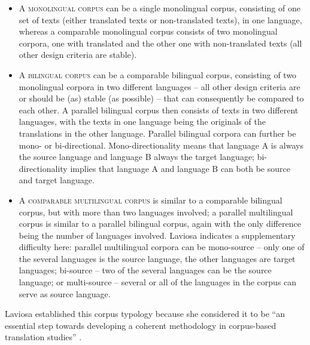 \begin{itemize}
\item 
A \textsc{monolingual corpus} can be a single monolingual corpus, consisting of one set of texts (either translated texts or non-translated texts), in one language, whereas a comparable monolingual corpus consists of two monolingual corpora, one with translated and the other one with non-translated texts (all other design criteria are stable).
\item 
A \textsc{bilingual corpus} can be a comparable bilingual corpus, consisting of two monolingual corpora in two different languages – all other design criteria are or should be (as) stable (as possible) – that can consequently be compared to each other. A parallel bilingual corpus then consists of texts in two different languages, with the texts in one language being the originals of the translations in the other language. Parallel bilingual corpora can further be mono- or bi-directional. Mono-directionality means that language A is always the source language and language B always the target language; bi-directionality implies that language A and language B can both be source and target language.
\item 
A \textsc{comparable multilingual corpus} is similar to a comparable bilingual corpus, but with more than two languages involved; a parallel multilingual corpus is similar to a parallel bilingual corpus, again with the only difference being the number of languages involved. Laviosa indicates a supplementary difficulty here: parallel multilingual corpora can be mono-source – only one of the several languages is the source language, the other languages are target languages; bi-source – two of the several languages can be the source language; or multi-source – several or all of the languages in the corpus can serve as source language.
\end{itemize}

Laviosa established this corpus typology because she considered it to be “an essential step towards developing a coherent methodology in corpus-based translation studies” \citep[38]{laviosa_corpus-based_2002}.

